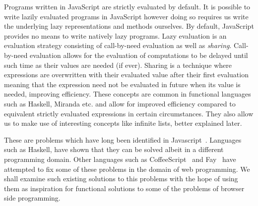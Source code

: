 Programs written in JavaScript are strictly evaluated by default. It is possible to write
lazily evaluated programs in JavaScript however doing so requires us write the underlying
lazy representations and methods ourselves. By default, JavaScript provides no means to 
write natively lazy programs. Lazy evaluation is an evaluation strategy consisting of 
call-by-need evaluation as well as \emph{sharing}. Call-by-need evaluation allows for the evaluation of
computations to be delayed until such time as their values are needed (if ever). Sharing
is a technique where expressions are overwritten with their evaluated value after their
first evaluation meaning that the expression need not be evaluated in future when its
value is needed, improving efficiency. These concepts are common in functional languages
such as Haskell, Miranda etc. and allow for improved efficiency compared to equivalent
strictly evaluated expressions in certain circumstances. They also allow us to make use
of interesting concepts like infinite lists, better explained later.

These are problems which have long been identified in Javascript~\cite{JSGoodParts}. Languages such
as Haskell, have shown that they can be solved albeit in a different programming domain.
Other languages such as CoffeeScript~\cite{Coffee} and Fay~\cite{Fay} have attempted to fix some of these 
problems in the domain of web programming. We shall examine such existing solutions
to this problems with the hope of using them as inspiration for functional solutions
to some of the problems of browser side programming.
